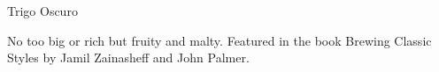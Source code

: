 \begin{recipe}{Trigo Oscuro}

\begin{aboutblock}
No too big or rich but fruity and malty. Featured in the book Brewing Classic
Styles by Jamil Zainasheff and John Palmer. \sourceaha
\end{aboutblock}


\begin{methodandtiming}

\begin{mashsteps}
\end{mashsteps}

\begin{fermentationsteps}
\end{fermentationsteps}

\end{methodandtiming}

\recipebreak

\begin{ingredientsblock}

\begin{malts}
\end{malts}

\begin{hops}
\end{hops}


\end{ingredientsblock}

\end{recipe}
